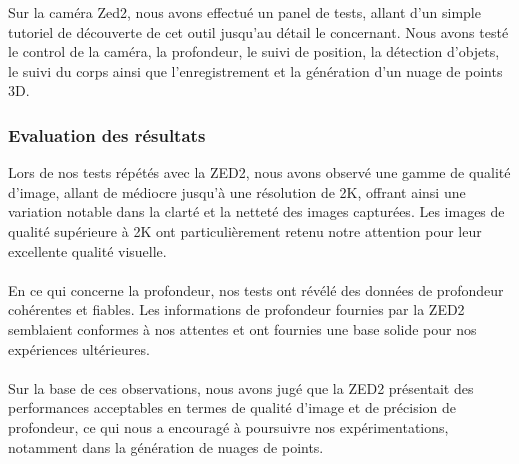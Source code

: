     \normalsize{
        Sur la caméra Zed2, nous avons effectué un panel de tests, allant d'un simple tutoriel \cite{zed_sdk} de découverte de cet outil jusqu'au détail le concernant. Nous avons testé le control de la caméra, la profondeur, le suivi de position, la détection d'objets, le suivi du corps ainsi que l'enregistrement et la génération d'un nuage de points 3D.
    }

    \subsubsection{Evaluation des résultats}
        \normalsize{
            Lors de nos tests répétés avec la ZED2, nous avons observé une gamme de qualité d'image, allant de médiocre jusqu'à une résolution de 2K, offrant ainsi une variation notable dans la clarté et la netteté des images capturées. Les images de qualité supérieure à 2K ont particulièrement retenu notre attention pour leur excellente qualité visuelle.
        }
        \\ \\
        \normalsize{
            En ce qui concerne la profondeur, nos tests ont révélé des données de profondeur cohérentes et fiables. Les informations de profondeur fournies par la ZED2 semblaient conformes à nos attentes et ont fournies une base solide pour nos expériences ultérieures.
        }
        \\ \\
        \normalsize{
            Sur la base de ces observations, nous avons jugé que la ZED2 présentait des performances acceptables en termes de qualité d'image et de précision de profondeur, ce qui nous a encouragé à poursuivre nos expérimentations, notamment dans la génération de nuages de points.
        }

